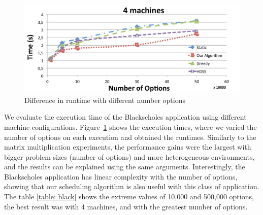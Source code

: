 \documentclass[journal]{IEEEtran}
\begin{document}
\begin{figure}[htb]
\begin{center}
		\includegraphics[scale=0.3]{4machineBlack.pdf} 
	\caption{Difference in runtime with different number options}
	\label{fig:black}
	\end{center}
\end{figure}

We evaluate the execution time of the Blackscholes application using different
machine configurations. Figure~\ref{fig:black} shows the execution times, where
we varied the number of options on each execution and obtained the
runtimes. Similarly to the matrix multiplication experiments, the performance
gains were the largest with bigger problem sizes (number of options) and more
heterogeneous environments, and the results can be explained using the same
arguments. Interestingly, the Blackscholes application has linear complexity
with the number of options, showing that our scheduling algorithm is also useful
with this class of application. The table \ref{table: black} shows the extreme values ​​of 10,000 and 500,000 options, the best result was with 4 machines, and with the greatest number of options.
\end{document}
